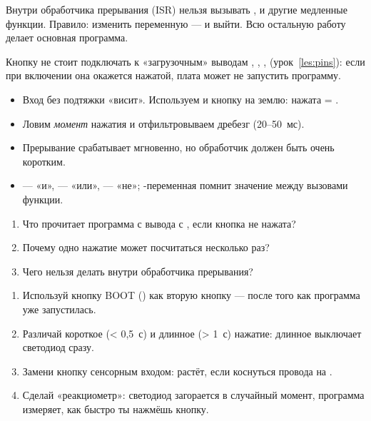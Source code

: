 
\begin{caution}
Внутри обработчика прерывания (ISR) нельзя вызывать ,  и другие медленные
функции. Правило: изменить переменную --- и выйти. Всю остальную работу делает основная программа.
\end{caution}

\begin{tip}
Кнопку не стоит подключать к «загрузочным» выводам , , ,  (урок~\ref{les:pins}):
если при включении она окажется нажатой, плата может не запустить программу.
\end{tip}

\begin{summary}
\begin{itemize}[leftmargin=*]
  \item Вход без подтяжки «висит». Используем  и кнопку на землю: нажата = .
  \item Ловим \emph{момент} нажатия и отфильтровываем дребезг (20--50~мс).
  \item Прерывание срабатывает мгновенно, но обработчик должен быть очень коротким.
  \item \code{\&\&} --- «и», \code{||} --- «или», \code{!} --- «не»; -переменная помнит значение между вызовами функции.
\end{itemize}
\end{summary}

\begin{quiz}
\begin{enumerate}
  \item Что прочитает программа с вывода с , если кнопка не нажата?
  \item Почему одно нажатие может посчитаться несколько раз?
  \item Чего нельзя делать внутри обработчика прерывания?
\end{enumerate}
\end{quiz}

\begin{tasks}
\begin{enumerate}
  \item Используй кнопку BOOT () как вторую кнопку --- после того как программа уже запустилась.
  \item Различай короткое (< 0,5~с) и длинное (> 1~с) нажатие: длинное выключает светодиод сразу.
  \item Замени кнопку сенсорным входом:  растёт, если коснуться провода на .
  \item Сделай «реакциометр»: светодиод загорается в случайный момент, программа измеряет, как быстро ты нажмёшь кнопку.
\end{enumerate}
\end{tasks}
